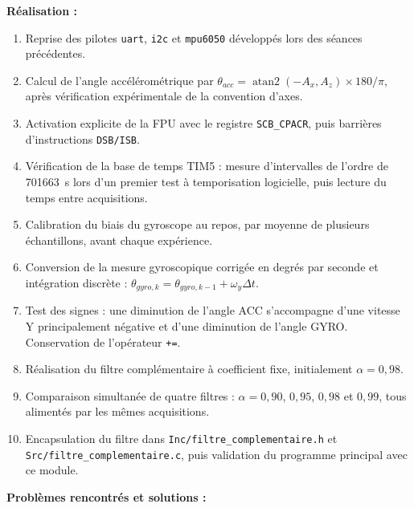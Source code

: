 \documentclass[11pt,a4paper]{article}
\begin{document}
\begin{sessionbox}
		\vspace{0.3cm}
		
		\textbf{Réalisation :}
		
		\begin{enumerate}
			\item Reprise des pilotes \texttt{uart}, \texttt{i2c} et \texttt{mpu6050} développés lors des séances précédentes.
			\item Calcul de l'angle accélérométrique par \(\theta_{acc}=\operatorname{atan2}(-A_x,A_z)\times 180/\pi\), après vérification expérimentale de la convention d'axes.
			\item Activation explicite de la FPU avec le registre \texttt{SCB\_CPACR}, puis barrières d'instructions \texttt{DSB/ISB}.
			\item Vérification de la base de temps TIM5 : mesure d'intervalles de l'ordre de 701663~\textmu s lors d'un premier test à temporisation logicielle, puis lecture du temps entre acquisitions.
			\item Calibration du biais du gyroscope au repos, par moyenne de plusieurs échantillons, avant chaque expérience.
			\item Conversion de la mesure gyroscopique corrigée en degrés par seconde et intégration discrète : \(\theta_{gyro,k}=\theta_{gyro,k-1}+\omega_y\Delta t\).
			\item Test des signes : une diminution de l'angle ACC s'accompagne d'une vitesse Y principalement négative et d'une diminution de l'angle GYRO. Conservation de l'opérateur \texttt{+=}.
			\item Réalisation du filtre complémentaire à coefficient fixe, initialement \(\alpha=0{,}98\).
			\item Comparaison simultanée de quatre filtres : \(\alpha=0{,}90\), \(0{,}95\), \(0{,}98\) et \(0{,}99\), tous alimentés par les mêmes acquisitions.
			\item Encapsulation du filtre dans \texttt{Inc/filtre\_complementaire.h} et \texttt{Src/filtre\_complementaire.c}, puis validation du programme principal avec ce module.
		\end{enumerate}
		
		\vspace{0.3cm}
		
		\textbf{Problèmes rencontrés et solutions :}
		

\end{sessionbox}
\end{document}
